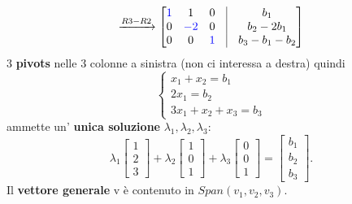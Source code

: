 \documentclass[a4paper, 12pt]{report}
\begin{document}
                    $$
                    \xrightarrow{R3-R2}
                    \begin{bmatrix}
                        \textcolor{blue}{1} & 1 & 0 & \vline & b_1\\
                        0 & \textcolor{blue}{-2} & 0 & \vline & b_2-2b_1\\
                        0 & 0 & \textcolor{blue}{1} & \vline & b_3-b_1-b_2
                    \end{bmatrix}
                    $$
                    3 \textbf{pivots} nelle 3 colonne a sinistra (non ci interessa a destra) quindi
                    $$
                    \begin{cases}
                        x_1+x_2=b_1\\
                        2x_1=b_2\\
                        3x_1+x_2+x_3=b_3
                    \end{cases}
                    $$
                    ammette un' \textbf{unica soluzione} $\lambda_1,\lambda_2,\lambda_3$:
                    $$
                    \lambda_1
                    \begin{bmatrix}
                        1\\
                        2\\
                        3
                    \end{bmatrix}
                    +\lambda_2
                    \begin{bmatrix}
                        1\\
                        0\\
                        1
                    \end{bmatrix}
                    +\lambda_3
                    \begin{bmatrix}
                        0\\
                        0\\
                        1
                    \end{bmatrix}
                    =
                    \begin{bmatrix}
                        b_1\\
                        b_2\\
                        b_3
                    \end{bmatrix}
                    \text{.}
                    $$
                    Il \textbf{vettore generale} v è contenuto in $Span(v_1,v_2,v_3)$.
\end{document}
